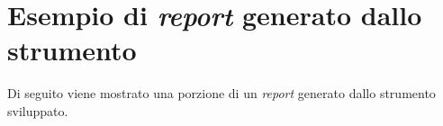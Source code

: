 \chapter{Esempio di \textit{report} generato dallo strumento}

Di seguito viene mostrato una porzione di un \textit{report} generato dallo strumento sviluppato.

